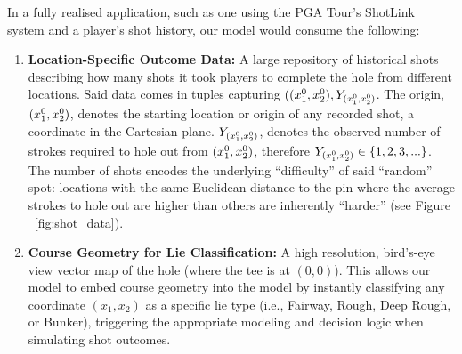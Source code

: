 \documentclass[11pt, letterpaper]{article}
\begin{document}
In a fully realised application, such as one using the PGA Tour's ShotLink system and a player's shot history, our model would consume the following:
\begin{enumerate}
    \item \textbf{Location-Specific Outcome Data:} A large repository of historical shots describing how many shots it took players to complete the hole from different locations. Said data comes in tuples capturing $((x_1^0,x_2^0), Y_{(x_1^0,x_2^0)}$. The origin, $(x_1^0,x_2^0)$, denotes the starting location or origin of any recorded shot, a coordinate in the Cartesian plane. $Y_{(x_1^0,x_2^0)}$, denotes the observed number of strokes required to hole out from $(x_1^0,x_2^0)$, therefore $Y_{(x_1^0,x_2^0)} \in \{1,2,3,...\}$. The number of shots encodes the underlying ``difficulty'' of said ``random'' spot: locations with the same Euclidean distance to the pin where the average strokes to hole out are higher than others are inherently ``harder'' (see Figure ~\ref{fig:shot_data}).
    \item \textbf{Course Geometry for Lie Classification:} A high resolution, bird's-eye view vector map of the hole (where the tee is at $(0,0)$). This allows our model to embed course geometry into the model by instantly classifying any coordinate $(x_1,x_2)$ as a specific lie type (i.e., Fairway, Rough, Deep Rough, or Bunker), triggering the appropriate modeling and decision logic when simulating shot outcomes.


\end{enumerate}
\end{document}
